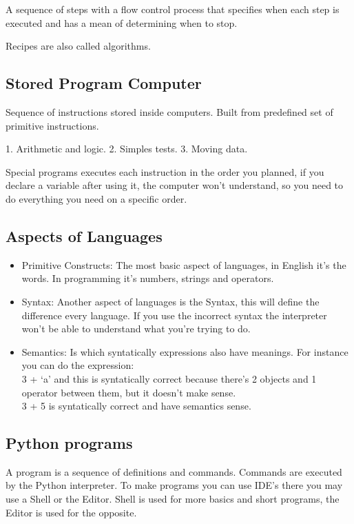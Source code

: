 \documentclass{article}
\begin{document}
{A sequence of steps with a flow control process that
specifies when each step is executed and has a mean 
of determining when to stop.

Recipes are also called algorithms.

\subsection*{Stored Program Computer}

Sequence of instructions stored inside computers.
Built from predefined set of primitive instructions.

1. Arithmetic and logic. 
2. Simples tests. 
3. Moving data. 

\newpage

Special programs executes each instruction in the order
you planned, if you declare a variable after using it,
the computer won't understand, so you need to do everything
you need on a specific order.

\subsection*{Aspects of Languages}

\begin{itemize}
    \item Primitive Constructs: The most basic aspect 
    of languages, in English it's the words. In programming
    it's numbers, strings and operators.
    \item Syntax: Another aspect of languages is the Syntax,
    this will define the difference every language. If you
    use the incorrect syntax the interpreter won't be able
    to understand what you're trying to do.
    \item Semantics: Is which syntatically expressions
    also have meanings. For instance you can do the expression:\\
    3 + `a' and this is syntatically correct because there's
    2 objects and 1 operator between them, but it doesn't make sense.\\
    3 + 5 is syntatically correct and have semantics sense.
\end{itemize}

\subsection*{Python programs}

A program is a sequence of definitions and commands.
Commands are executed by the Python interpreter.
To make programs you can use IDE's there you may use
a Shell or the Editor. Shell is used for more basics
and short programs, the Editor is used for the opposite.

}
\end{document}

